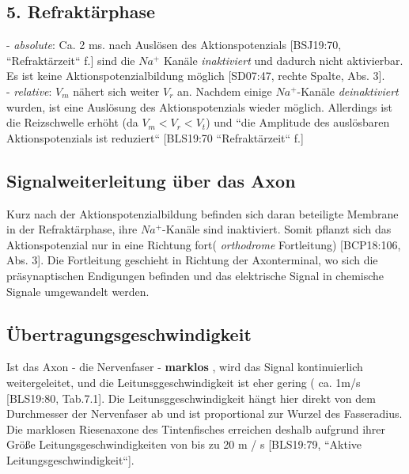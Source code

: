 {{\subsection*{5. Refraktärphase\footnotemark[50]}

- \textit{absolute}: Ca. 2 ms.
nach Auslösen des Aktionspotenzials [BSJ19:70, ``Refraktärzeit`` f.] sind die $Na^+$ Kanäle  \textit{inaktiviert} und dadurch nicht aktivierbar.
Es ist keine Aktionspotenzialbildung möglich [SD07:47, rechte Spalte, Abs. 3].\\
- \textit{relative}: $V_m$ nähert sich weiter $V_r$ an.
Nachdem einige $Na^+$-Kanäle  \textit{deinaktiviert} wurden, ist eine Auslösung des Aktionspotenzials wieder möglich.
Allerdings ist die Reizschwelle erhöht (da $V_m < V_r < V_t$) und ``die Amplitude des auslösbaren Aktionspotenzials ist reduziert`` [BLS19:70  ``Refraktärzeit`` f.]

\subsection{Signalweiterleitung über das Axon}

Kurz nach der Aktionspotenzialbildung befinden sich daran beteiligte Membrane in der Refraktärphase, ihre $Na^+$-Kanäle sind inaktiviert. 
Somit pflanzt sich das Aktionspotenzial nur in eine Richtung fort\footnotemark[51] ( \textit{orthodrome} Fortleitung) [BCP18:106, Abs. 3].
Die Fortleitung geschieht in Richtung der Axonterminal, wo sich die präsynaptischen Endigungen befinden und das elektrische Signal in chemische Signale umgewandelt werden.

\subsection*{Übertragungsgeschwindigkeit}
Ist das Axon - die Nervenfaser - \textbf{marklos} , wird das Signal kontinuierlich weitergeleitet, und die Leitunsggeschwindigkeit ist eher gering ( ca. 1m/s [BLS19:80, Tab.7.1].
Die Leitunsggeschwindigkeit hängt hier direkt von dem Durchmesser der Nervenfaser ab und ist proportional zur Wurzel des Fasseradius. 
Die marklosen Riesenaxone des Tintenfisches erreichen deshalb aufgrund ihrer Größe Leitungsgeschwindigkeiten von bis zu 20 m / s [BLS19:79, ``Aktive Leitungsgeschwindigkeit``].

}}
